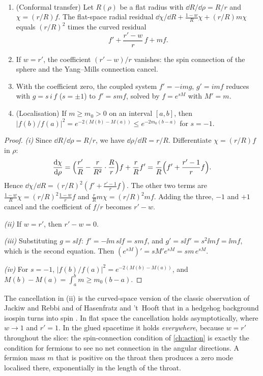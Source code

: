 \begin{theorem}\label{thm:zeromode}\ver\
\begin{enumerate}[label=(\roman*)]
\item (Conformal transfer) Let $R(\rho)$ be a flat radius with $\dd R/\dd\rho=R/r$ and $\chi=(r/R)f$. The flat-space radial residual $\dd\chi/\dd R+\frac{1-w}R\chi+(r/R)m\chi$ equals $(r/R)^2$ times the curved residual
\[
f'+\frac{r'-w}r\,f+mf .
\]
\item If $w=r'$, the coefficient $(r'-w)/r$ vanishes: the spin connection of the sphere and the Yang--Mills connection cancel.
\item With the coefficient zero, the coupled system $f'=-img$, $g'=imf$ reduces with $g=s\,i\,f$ ($s=\pm1$) to $f'=smf$, solved by $f=e^{sM}$ with $M'=m$.
\item (Localisation) If $m\ge m_0>0$ on an interval $[a,b]$, then $|f(b)/f(a)|^2=e^{-2(M(b)-M(a))}\le e^{-2m_0(b-a)}$ for $s=-1$.
\end{enumerate}
\end{theorem}
\begin{proof}
\emph{(i)} Since $\dd R/\dd\rho=R/r$, we have $\dd\rho/\dd R=r/R$. Differentiate $\chi=(r/R)f$ in $\rho$:
\[
\frac{\mathrm{d}\chi}{\mathrm{d}\rho}=\Bigl(\frac{r'}R-\frac r{R^2}\cdot\frac Rr\Bigr)f+\frac rRf'=\frac rR\Bigl(f'+\frac{r'-1}rf\Bigr).
\]
Hence $\dd\chi/\dd R=(r/R)^2(f'+\frac{r'-1}rf)$. The other two terms are $\frac{1-w}R\chi=(r/R)^2\frac{1-w}rf$ and $\frac rRm\chi=(r/R)^2mf$. Adding the three, $-1$ and $+1$ cancel and the coefficient of $f/r$ becomes $r'-w$.

\emph{(ii)} If $w=r'$, then $r'-w=0$.

\emph{(iii)} Substituting $g=s\ii f$: $f'=-\ii m\,s\ii f=smf$, and $g'=s\ii f'=s^2\ii mf=\ii mf$, which is the second equation. Then $(e^{sM})'=sM'e^{sM}=sm\,e^{sM}$.

\emph{(iv)} For $s=-1$, $|f(b)/f(a)|^2=e^{-2(M(b)-M(a))}$, and $M(b)-M(a)=\int_a^bm\ge m_0(b-a)$.
\end{proof}


The cancellation in (ii) is the curved-space version of the classic observation of Jackiw and Rebbi and of Hasenfratz and 't~Hooft that in a hedgehog background isospin turns into spin \cite{JackiwRebbi1976}. In flat space the cancellation holds asymptotically, where $w\to1$ and $r'=1$. In the glued spacetime it holds \emph{everywhere}, because $w=r'$ throughout the slice: the spin-connection condition of \cref{ch:action} is exactly the condition for fermions to see no net connection in the angular directions. A fermion mass $m$ that is positive on the throat then produces a zero mode localised there, exponentially in the length of the throat.

